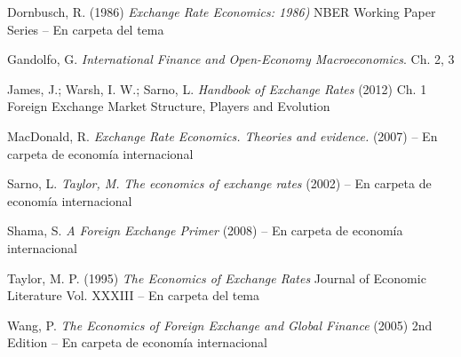 \documentclass{nuevotema}
\begin{document}
Dornbusch, R. (1986) \textit{Exchange Rate Economics: 1986)} NBER Working Paper Series -- En carpeta del tema

Gandolfo, G. \textit{International Finance and Open-Economy Macroeconomics}. Ch. 2, 3

James, J.; Warsh, I. W.; Sarno, L. \textit{Handbook of Exchange Rates} (2012) Ch. 1 Foreign Exchange Market Structure, Players and Evolution

MacDonald, R. \textit{Exchange Rate Economics. Theories and evidence.} (2007) -- En carpeta de economía internacional

Sarno, L. \textit{Taylor, M.} \textit{The economics of exchange rates} (2002) -- En carpeta de economía internacional

Shama, S. \textit{A Foreign Exchange Primer} (2008) -- En carpeta de economía internacional

Taylor, M. P. (1995) \textit{The Economics of Exchange Rates} Journal of Economic Literature Vol. XXXIII -- En carpeta del tema

Wang, P. \textit{The Economics of Foreign Exchange and Global Finance} (2005) 2nd Edition -- En carpeta de economía internacional
\end{document}
